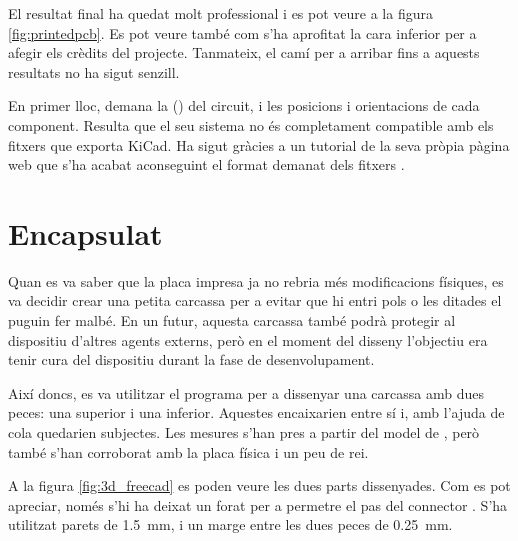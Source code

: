 El resultat final ha quedat molt professional i es pot veure a la figura
\ref{fig:printedpcb}. Es pot veure també com s'ha aprofitat la cara inferior
per a afegir els crèdits del projecte. Tanmateix, el camí per a arribar fins
a aquests resultats no ha sigut senzill.

En primer lloc,  demana la  ()
del circuit, i les posicions i orientacions de cada component. Resulta que el
seu sistema no és completament compatible amb els fitxers que exporta
KiCad. Ha sigut gràcies a un tutorial de la seva pròpia pàgina web que s'ha
acabat aconseguint el format demanat dels fitxers \cite{KiCADJLC}.

\section{Encapsulat}

Quan es va saber que la placa impresa ja no rebria més modificacions físiques,
es va decidir crear una petita carcassa per a evitar que hi entri pols o les
ditades el puguin fer malbé. En un futur, aquesta carcassa també podrà protegir
al dispositiu d'altres agents externs, però en el moment del disseny l'objectiu
era tenir cura del dispositiu durant la fase de desenvolupament.

Així doncs, es va utilitzar el programa  per a dissenyar una
carcassa amb dues peces: una superior i una inferior. Aquestes encaixarien entre
sí i, amb l'ajuda de cola quedarien subjectes. Les mesures s'han pres a partir
del model de , però també s'han corroborat amb la placa física i un
peu de rei.

A la figura \ref{fig:3d_freecad} es poden veure les dues parts dissenyades. Com es pot
apreciar, només s'hi ha deixat un forat per a permetre el pas del connector
. S'ha utilitzat parets de \SI{1.5}{\milli\meter}, i un marge entre
les dues peces de \SI{0.25}{\milli\meter}.

